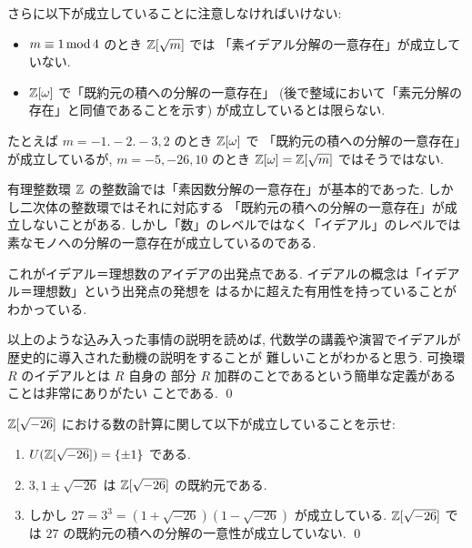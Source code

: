 \documentclass[12pt,twoside]{jarticle}
\begin{document}
\begin{guide}[二次体の整数環]
 さらに以下が成立していることに注意しなければいけない:
 \begin{itemize}
  \item  $m\equiv 1\mathop{\mathrm{mod}}\nolimits 4$ のとき ${\mathbb Z}[\sqrt{m}]$ では
  「素イデアル分解の一意存在」が成立していない.
  \item ${\mathbb Z}[\omega]$ で「既約元の積への分解の一意存在」
   (後で整域において「素元分解の存在」と同値であることを示す) 
   が成立しているとは限らない. 
 \end{itemize}
 たとえば $m=-1.-2.-3, 2$ のとき ${\mathbb Z}[\omega]$ で
 「既約元の積への分解の一意存在」が成立しているが, %
 $m=-5,-26,10$ のとき ${\mathbb Z}[\omega]={\mathbb Z}[\sqrt{m}]$ ではそうではない.

 有理整数環 ${\mathbb Z}$ の整数論では「素因数分解の一意存在」が基本的であった.
 しかし二次体の整数環ではそれに対応する
 「既約元の積への分解の一意存在」が成立しないことがある. 
 しかし「数」のレベルではなく「イデアル」のレベルでは
 素なモノへの分解の一意存在が成立しているのである.

 これがイデアル＝理想数のアイデアの出発点である.
 イデアルの概念は「イデアル＝理想数」という出発点の発想を
 はるかに超えた有用性を持っていることがわかっている.

 以上のような込み入った事情の説明を読めば, 
 代数学の講義や演習でイデアルが歴史的に導入された動機の説明をすることが
 難しいことがわかると思う.  可換環 $R$ のイデアルとは $R$ 自身の
 部分 $R$ 加群のことであるという簡単な定義があることは非常にありがたい
 ことである. 
 \qed
\end{guide}

\begin{question}
\label{q:Z[sqrt(-26)]}
 ${\mathbb Z}[\sqrt{-26}]$ における数の計算に関して以下が成立していることを示せ:
 \begin{enumerate}
  \item $U({\mathbb Z}[\sqrt{-26}])=\{\pm1\}$ である.
  \item $3, 1\pm\sqrt{-26}$ は ${\mathbb Z}[\sqrt{-26}]$ の既約元である.
  \item しかし $27=3^3=(1+\sqrt{-26})(1-\sqrt{-26})$ が成立している.
   ${\mathbb Z}[\sqrt{-26}]$ では $27$ の既約元の積への分解の一意性が成立していない.
   \qed
 \end{enumerate}
\end{question}
\end{document}
